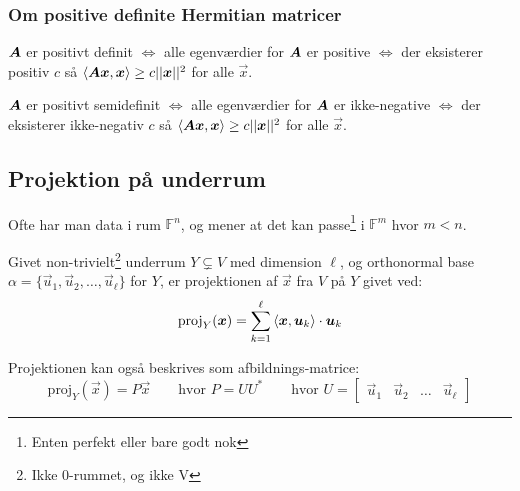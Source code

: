 \subsubsection{Om positive definite Hermitian matricer}
$\boldsymbol{A}$ er positivt definit $\iff$ alle egenværdier for $\boldsymbol{A}$ er positive $\iff$ der eksisterer positiv $c$ så $\left \langle \boldsymbol{A} \boldsymbol{x}, \boldsymbol{x} \right \rangle \geq c ||\boldsymbol{x}||^2$ for alle $\vec x$.

$\boldsymbol{A}$ er positivt semidefinit $\iff$ alle egenværdier for $\boldsymbol{A}$ er ikke-negative $\iff$ der eksisterer ikke-negativ $c$ så $\left \langle \boldsymbol{A} \boldsymbol{x}, \boldsymbol{x} \right \rangle \geq c ||\boldsymbol{x}||^2$ for alle $\vec x$. 

\subsection{Projektion på underrum}
Ofte har man data i rum $\mathbb F^n$, og mener at det kan passe\footnote{Enten perfekt eller bare godt nok} i $\mathbb F^m$ hvor $m < n$.

Givet non-trivielt\footnote{Ikke 0-rummet, og ikke V} underrum $Y \subsetneq V$ med dimension $\ell$, og orthonormal base $\alpha = \{\vec u_1, \vec u_2, \ldots, \vec u_\ell\}$ for $Y$, er projektionen af $\vec x$ fra $V$ på $Y$ givet ved:
\[
\text{proj}_Y (\boldsymbol{x}) = \sum_{k=1}^\ell \left \langle \boldsymbol{x}, \boldsymbol{u}_k \right \rangle \cdot \boldsymbol{u}_k
\]

Projektionen kan også beskrives som afbildnings-matrice:
\[
    \text{proj}_Y (\vec x) 
    = P \vec x 
    \qquad \text{hvor } P = U U^* 
    \qquad \text{hvor } U = \begin{bmatrix}
        \vec u_1 & \vec u_2 & \ldots & \vec u_\ell
    \end{bmatrix}
\]